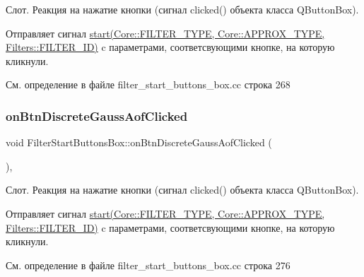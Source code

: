 Слот. Реакция на нажатие кнопки (сигнал clicked() объекта класса Q\+Button\+Box).

Отправляет сигнал \hyperlink{class_filter_start_buttons_box_ac6e2a6555f1d388391f188f834b8e753}{start(\+Core\+::\+F\+I\+L\+T\+E\+R\+\_\+\+T\+Y\+P\+E, Core\+::\+A\+P\+P\+R\+O\+X\+\_\+\+T\+Y\+P\+E, Filters\+::\+F\+I\+L\+T\+E\+R\+\_\+\+I\+D)} c параметрами, соответсвующими кнопке, на которую кликнули. 

См. определение в файле filter\+\_\+start\+\_\+buttons\+\_\+box.\+cc строка 268

\hypertarget{class_filter_start_buttons_box_a08891ce1d3fc71d2358ba9f48e076fd7}{}\label{class_filter_start_buttons_box_a08891ce1d3fc71d2358ba9f48e076fd7} 
\subsubsection{\texorpdfstring{on\+Btn\+Discrete\+Gauss\+Aof\+Clicked}{onBtnDiscreteGaussAofClicked}}
{\footnotesize\ttfamily void Filter\+Start\+Buttons\+Box\+::on\+Btn\+Discrete\+Gauss\+Aof\+Clicked (\begin{DoxyParamCaption}{ }\end{DoxyParamCaption})\hspace{0.3cm}{\ttfamily [private]}, {\ttfamily [slot]}}

Слот. Реакция на нажатие кнопки (сигнал clicked() объекта класса Q\+Button\+Box).

Отправляет сигнал \hyperlink{class_filter_start_buttons_box_ac6e2a6555f1d388391f188f834b8e753}{start(\+Core\+::\+F\+I\+L\+T\+E\+R\+\_\+\+T\+Y\+P\+E, Core\+::\+A\+P\+P\+R\+O\+X\+\_\+\+T\+Y\+P\+E, Filters\+::\+F\+I\+L\+T\+E\+R\+\_\+\+I\+D)} c параметрами, соответсвующими кнопке, на которую кликнули. 

См. определение в файле filter\+\_\+start\+\_\+buttons\+\_\+box.\+cc строка 276

\hypertarget{class_filter_start_buttons_box_a0285f32777c968c369c25c91940837d0}{}\label{class_filter_start_buttons_box_a0285f32777c968c369c25c91940837d0} 

